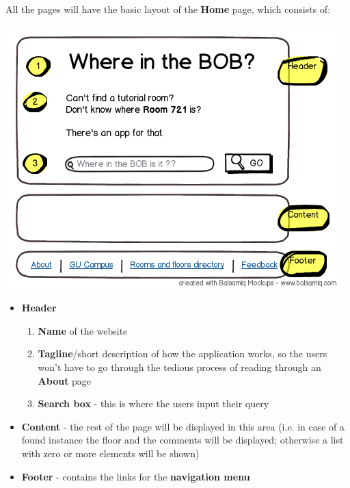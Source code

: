 \documentclass{sig-alt-release2}
\begin{document}
All the pages will have the basic layout of the \textbf{Home} page, which
consists of:
\begin{center}
\includegraphics[scale=0.55]{img/wireframes/home2.png}
\end{center}
\begin{itemize} \itemsep1pt \parskip0pt 
	\item{
		\textbf{Header}
		\begin{enumerate} \itemsep1pt \parskip0pt 
			\item{
				\textbf{Name} of the website
			}
			\item{
				\textbf{Tagline}/short description of how the application works, so
				the users won't have to go through the tedious process of
				reading through an \textbf{About} page
			}
			\item{
				\textbf{Search box} - this is where the users input their
				query
			}
		\end{enumerate}
	}

	\item{
		\textbf{Content} - the rest of the page will be displayed in this area
				   (i.e. in case of a found instance the floor and the 
				   comments will be displayed; otherwise a list with zero
				   or more elements will be shown)					
	}
	
	\item{\textbf{Footer} - contains the links for the \textbf{navigation menu}
	}
\end{itemize}
\end{document}
